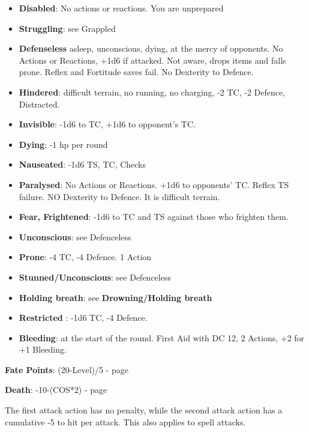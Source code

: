 \documentclass[landscape,10pt,a4paper]{article}
\begin{document}
\begin{multicols}{3}
\begin{dmbox}[title=Conditions]
\begin{itemize}[leftmargin=0.5cm,itemsep=-1pt,parsep=0pt]
\item \textbf{Disabled}: No actions or reactions. You are unprepared
\item \textbf{Struggling}: see Grappled
\item \textbf{Defenseless} asleep, unconscious, dying, at the mercy of opponents. No Actions or Reactions, +1d6 if attacked. Not aware, drops items and falls prone. Reflex and Fortitude saves fail. No Dexterity to Defence.
\item \textbf{Hindered}: difficult terrain, no running, no charging, -2 TC, -2 Defence, Distracted.
\item \textbf{Invisible}: -1d6 to TC, +1d6 to opponent's TC.
\item \textbf{Dying}: -1 hp per round
\item \textbf{Nauseated}: -1d6 TS, TC, Checks
\item \textbf{Paralysed}: No Actions or Reactions. +1d6 to opponents' TC. Reflex TS failure. NO Dexterity to Defence. It is difficult terrain.
\item \textbf{Fear, Frightened}: -1d6 to TC and TS against those who frighten them.
\item \textbf{Unconscious}: see Defenceless
\item \textbf{Prone}: -4 TC, -4 Defence. 1 Action
\item \textbf{Stunned/Unconscious}: see Defenceless
\item \textbf{Holding breath}: see \textbf{Drowning/Holding breath}
\item \textbf{Restricted} : -1d6 TC, -4 Defence.
\item \textbf{Bleeding}: at the start of the round. First Aid with DC 12, 2 Actions, +2 for +1 Bleeding.

\end{itemize}

\end{dmbox}

\begin{mybluebox}\textbf{Fate Points}: (20-Level)/5 - page \pageref{fatepoints}\end{mybluebox}

\begin{mybluebox}\textbf{Death}: -10-(COS*2) - page \pageref{dying}\end{mybluebox}

\begin{dmbox}[title=Multiple Attacks - page \pageref{multiple attacks melee}]
The first attack action has no penalty, while the second attack action has a cumulative -5 to hit per attack. This also applies to spell attacks.
\end{dmbox}


\end{multicols}
\end{document}
